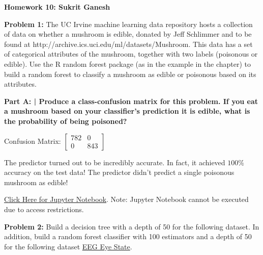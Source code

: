 \documentclass{article}
\begin{document}
 
 \begin{center}
     \Huge\textbf{Homework 10: Sukrit Ganesh}\par
 \end{center}
 
  \noindent\makebox[\linewidth]{\rule{\paperwidth}{0.4pt}}\newline
 
 \begin{center}
      \Large\textbf{Problem 1:} The UC Irvine machine learning data repository hosts a collection of data on whether a mushroom is edible, donated by Jeff Schlimmer and to be found at http://archive.ics.uci.edu/ml/datasets/Mushroom. This data has a set of categorical attributes of the mushroom, together with two labels (poisonous or edible). Use the R random forest package (as in the example in the chapter) to build a random forest to classify a mushroom as edible or poisonous based on its attributes. \par
 \end{center}
 
 \textbf{Part A: | Produce a class-confusion matrix for this problem. If you eat a mushroom based on your classifier’s prediction it is edible, what is the probability of being poisoned?}\newline
 
 Confusion Matrix: 
 $\begin{bmatrix}
     782 & 0\\
     0 & 843
 \end{bmatrix}$
 
 The predictor turned out to be incredibly accurate. In fact, it achieved $100\%$ accuracy on the test data! The predictor didn't predict a single poisonous mushroom as edible!
 
 \href{https://colab.research.google.com/drive/1fXUYFu60kAVWE0G_9JVYSO7rCusaLWYm}{Click Here for Jupyter Notebook}. Note: Jupyter Notebook cannot be executed due to access restrictions.
 
 \newpage
 
 \noindent\makebox[\linewidth]{\rule{\paperwidth}{0.4pt}}\newline
 
 \begin{center}
      \Large\textbf{Problem 2:} Build a decision tree with a depth of 50 for the following dataset. In addition, build a random forest classifier with 100 estimators and a depth of 50 for the following dataset \href{https://archive.ics.uci.edu/ml/datasets/EEG+Eye+State}{EEG Eye State}. \par
 \end{center}
 
\end{document}
